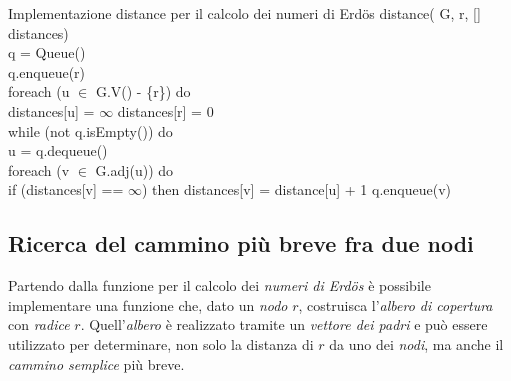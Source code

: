 \begin{minicode}{Implementazione distance per il calcolo dei numeri di Erdös}
\ind distance( G,  r, [] distances)\\
     q = Queue()\\
    q.enqueue(r)\\
    \indf foreach (u $\in$ G.V() - \{r\}) do\\
        distances[u] = $\infty$\hfill{}
    \indf distances[r] = 0\\
    \indf while (not q.isEmpty()) do\\
         u = q.dequeue()\\
        \indff foreach (v $\in$ G.adj(u)) do\\
            \indfff if (distances[v] == $\infty$) then\hfill{}
                distances[v] = distance[u] + 1\hfill{}
                q.enqueue(v)
\end{minicode}

\subsection{Ricerca del cammino più breve fra due nodi}
Partendo dalla funzione per il calcolo dei \emph{numeri di Erdös} è possibile
implementare una funzione che, dato un \emph{nodo} $r$, costruisca l'\emph{albero
di copertura} con \emph{radice} $r$. Quell'\emph{albero} è realizzato tramite un
\emph{vettore dei padri} e può essere utilizzato per determinare, non solo la
distanza di $r$ da uno dei \emph{nodi}, ma anche il \emph{cammino semplice} più
breve.

